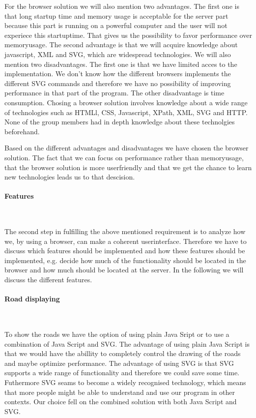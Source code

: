 \documentclass[a4paper,10pt,titlepage]{article}
\begin{document}
For the browser solution we will also mention two advantages. The first one is that long startup time and memory usage is acceptable for the server part because this part is running on a powerful computer and the user will not experiece this startuptime. That gives us the possibility to favor performance over memoryusage. The second advantage is that we will acquire knowledge about javascript, XML and SVG, which are widespread technologies. We will also mention two disadvantages. The first one is that we have limited acces to the implementation. We don't know how the different browsers implements the different SVG commands and therefore we have no possibility of improving performance in that part of the program. The other disadvantage is time consumption. Chosing a browser solution involves knowledge about a wide range of technologies such as HTMLl, CSS, Javascript, XPath, XML, SVG and HTTP. None of the group members had in depth knowledge about these technolgies beforehand.    

Based on the different advantages and disadvantages we have chosen the browser solution. The fact that we can focus on performance rather than memoryusage, that the browser solution is more userfriendly and that we get the chance to learn new technologies leads us to that descision.

\paragraph{Features}\mbox{}\

The second step in fulfilling the above mentioned requirement is to analyze how we, by using a browser, can make a coherent userinterface. Therefore we have to discuss which features should be implemented and how these features should be implemented, e.g. decide how much of the functionality should be located in the browser and how much should be located at the server. In the following we will discuss the different features.

\paragraph{Road displaying}\mbox{}\

To show the roads we have the option of using plain Java Sript or to use a combination of Java Script and SVG. The advantage of using plain Java Script is that we would have the abillity to completely control the drawing of the roads and maybe optimize performance. The advantage of using SVG is that SVG supports a wide range of functionality and therefore we could save some time. Futhermore SVG seams to become a widely recognised technology, which means that more people might be able to understand and use our program in other contexts. Our choice fell on the combined solution with both Java Script and SVG. 
 
\end{document}
